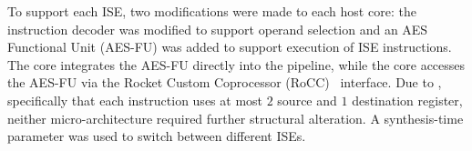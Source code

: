 \noindent
To support each ISE, two modifications were made to each host core:
the instruction decoder was modified to support
operand selection
and
an AES Functional Unit (AES-FU) was added to support execution of
ISE instructions.
The  core integrates the AES-FU directly into the pipeline,
while
the  core accesses the AES-FU via the
Rocket Custom Coprocessor (RoCC)~\cite[Section 4]{rocket:16}
interface.
Due to , 
specifically that each instruction uses at most $2$ source and $1$ destination register, 
neither micro-architecture required further structural alteration.
A synthesis-time parameter was used to switch between different 
ISEs.

